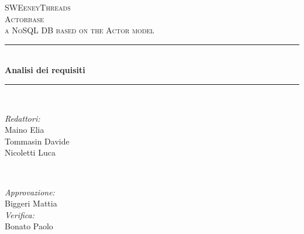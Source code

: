 \documentclass[a4paper]{article}
\begin{document}
	
	\begin{titlepage}
		\newcommand{\HRule}{\rule{\linewidth}{0.5mm}} 
		\center  
		
		\textsc{\LARGE SWEeneyThreads}\\[1.5cm] 
		\textsc{\Large Actorbase}\\[0.5cm] 
		\textsc{\large a NoSQL DB based on the Actor model}\\[0.5cm]
		
		
		\HRule \\[0.4cm]
		{ \huge \bfseries Analisi dei requisiti}\\[0.4cm] 
		\HRule \\[1.5cm]
		
		\begin{minipage}{0.4\textwidth}
			\begin{flushleft} \large
				\emph{Redattori:}\\
				Maino Elia \\
				Tommasin Davide \\
				Nicoletti Luca
			\end{flushleft}
		\end{minipage}
		~
		\begin{minipage}{0.4\textwidth}
			\begin{flushright} \large
				\emph{Approvazione:} \\
				Biggeri Mattia \\
				\emph{Verifica:} \\
				Bonato Paolo 
			\end{flushright}
		\end{minipage}
		

\end{titlepage}
\end{document}
